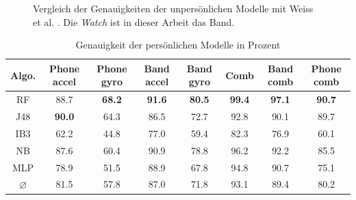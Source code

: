 \begin{figure}
	\centering
	\caption[Vergleich der Genauigkeiten der unpersönlichen Modelle mit Weiss et al. \cite{Weiss2016}]{Vergleich der Genauigkeiten der unpersönlichen Modelle mit Weiss et al. \cite{Weiss2016}. Die \textit{Watch} ist in dieser Arbeit das Band.}
	\label{fig:accuracy-impersonal-vs-weiss}
\end{figure}

\begin{table}
\centering
\footnotesize
\begin{tabular}{|c|c|c|c|c|c|c|c|}
	\hline 
	\textbf{Algo.} & \textbf{Phone accel} & \textbf{Phone gyro} & \textbf{Band accel} & \textbf{Band gyro} & \textbf{Comb} & \textbf{Band comb} & \textbf{Phone comb} \\ 
	\hline 
	RF & 88.7 & \textbf{68.2} & \textbf{91.6} & \textbf{80.5} & \textbf{99.4} & \textbf{97.1} & \textbf{90.7} \\ 
	J48 & \textbf{90.0} & 64.3 & 86.5 & 72.7 & 92.8 & 90.1 & 89.7 \\ 
	IB3 & 62.2 & 44.8 & 77.0 & 59.4 & 82.3 & 76.9 & 60.1 \\ 
	NB & 87.6 & 60.4 & 90.9 & 78.8 & 96.2 & 92.2 & 85.5 \\ 
	MLP & 78.9 & 51.5 & 88.9 & 67.8 & 94.8 & 90.7 & 75.1 \\ 
	\hline 
	$\varnothing$ & 81.5 & 57.8 & 87.0 & 71.8 & 93.1 & 89.4 & 80.2 \\ 
	\hline 
\end{tabular}
\caption{Genauigkeit der persönlichen Modelle in Prozent}
\label{tab:accuracy-personal}
\end{table}

